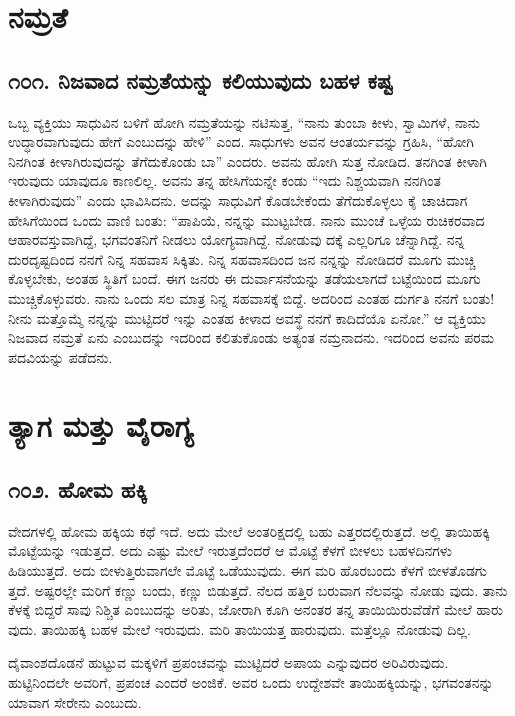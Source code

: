 \chapter{ನಮ್ರತೆ}

\section{\num{೧೦೧. } ನಿಜವಾದ ನಮ್ರತೆಯನ್ನು ಕಲಿಯುವುದು ಬಹಳ ಕಷ್ಟ}

ಒಬ್ಬ ವ್ಯಕ್ತಿಯು ಸಾಧುವಿನ ಬಳಿಗೆ ಹೋಗಿ ನಮ್ರತೆಯನ್ನು ನಟಿಸುತ್ತ, “ನಾನು ತುಂಬಾ ಕೀಳು, ಸ್ವಾಮಿಗಳೆ, ನಾನು ಉದ್ಧಾರವಾಗುವುದು ಹೇಗೆ ಎಂಬುದನ್ನು ಹೇಳಿ” ಎಂದ. ಸಾಧುಗಳು ಅವನ ಆಂತರ್ಯವನ್ನು ಗ್ರಹಿಸಿ, “ಹೋಗಿ ನಿನಗಿಂತ ಕೀಳಾಗಿರುವುದನ್ನು ತೆಗೆದುಕೊಂಡು ಬಾ” ಎಂದರು. ಅವನು ಹೋಗಿ ಸುತ್ತ ನೋಡಿದ. ತನಗಿಂತ ಕೀಳಾಗಿ ಇರುವುದು ಯಾವುದೂ ಕಾಣಲಿಲ್ಲ. ಅವನು ತನ್ನ ಹೇಸಿಗೆಯನ್ನೇ ಕಂಡು “ಇದು ನಿಶ್ಚಯವಾಗಿ ನನಗಿಂತ ಕೀಳಾಗಿರುವುದು” ಎಂದು ಭಾವಿಸಿದನು. ಅದನ್ನು ಸಾಧುವಿಗೆ ಕೊಡಬೇಕೆಂದು ತೆಗೆದುಕೊಳ್ಳಲು ಕೈ ಚಾಚಿದಾಗ ಹೇಸಿಗೆಯಿಂದ ಒಂದು ವಾಣಿ ಬಂತು: “ಪಾಪಿಯೆ, ನನ್ನನ್ನು ಮುಟ್ಟಬೇಡ. ನಾನು ಮುಂಚೆ ಒಳ್ಳೆಯ ರುಚಿಕರವಾದ ಆಹಾರವಸ್ತುವಾಗಿದ್ದೆ, ಭಗವಂತನಿಗೆ ನೀಡಲು ಯೋಗ್ಯವಾಗಿದ್ದೆ. ನೋಡುವು ದಕ್ಕೆ ಎಲ್ಲರಿಗೂ ಚೆನ್ನಾಗಿದ್ದೆ. ನನ್ನ ದುರದೃಷ್ಟದಿಂದ ನನಗೆ ನಿನ್ನ ಸಹವಾಸ ಸಿಕ್ಕಿತು. ನಿನ್ನ ಸಹವಾಸದಿಂದ ಜನ ನನ್ನನ್ನು ನೋಡಿದರೆ ಮೂಗು ಮುಚ್ಚಿ ಕೊಳ್ಳಬೇಕು, ಅಂತಹ ಸ್ಥಿತಿಗೆ ಬಂದೆ. ಈಗ ಜನರು ಈ ದುರ್ವಾಸನೆಯನ್ನು ತಡೆಯಲಾಗದೆ ಬಟ್ಟೆಯಿಂದ ಮೂಗು ಮುಚ್ಚಿಕೊಳ್ಳುವರು. ನಾನು ಒಂದು ಸಲ ಮಾತ್ರ ನಿನ್ನ ಸಹವಾಸಕ್ಕೆ ಬಿದ್ದೆ. ಅದರಿಂದ ಎಂತಹ ದುರ್ಗತಿ ನನಗೆ ಬಂತು! ನೀನು ಮತ್ತೊಮ್ಮೆ ನನ್ನನ್ನು ಮುಟ್ಟಿದರೆ ಇನ್ನು ಎಂತಹ ಕೀಳಾದ ಅವಸ್ಥೆ ನನಗೆ ಕಾದಿದೆಯೊ ಏನೋ.” ಆ ವ್ಯಕ್ತಿಯು ನಿಜವಾದ ನಮ್ರತೆ ಏನು ಎಂಬುದನ್ನು ಇದರಿಂದ ಕಲಿತುಕೊಂಡು ಅತ್ಯಂತ ನಮ್ರನಾದನು. ಇದರಿಂದ ಅವನು ಪರಮ ಪದವಿಯನ್ನು ಪಡೆದನು.

\chapter{ತ್ಯಾಗ ಮತ್ತು ವೈರಾಗ್ಯ}

\section{\num{೧೦೨. } ಹೋಮ ಹಕ್ಕಿ}

ವೇದಗಳಲ್ಲಿ ಹೋಮ ಹಕ್ಕಿಯ ಕಥೆ ಇದೆ. ಅದು ಮೇಲೆ ಅಂತರಿಕ್ಷದಲ್ಲಿ ಬಹು ಎತ್ತರದಲ್ಲಿರುತ್ತದೆ. ಅಲ್ಲಿ ತಾಯಿಹಕ್ಕಿ ಮೊಟ್ಟೆಯನ್ನು ಇಡುತ್ತದೆ. ಅದು ಎಷ್ಟು ಮೇಲೆ ಇರುತ್ತದೆಂದರೆ ಆ ಮೊಟ್ಟೆ ಕೆಳಗೆ ಬೀಳಲು ಬಹಳದಿನಗಳು ಹಿಡಿಯುತ್ತದೆ. ಅದು ಬೀಳುತ್ತಿರುವಾಗಲೇ ಮೊಟ್ಟೆ ಒಡೆಯುವುದು. ಈಗ ಮರಿ ಹೊರಬಂದು ಕೆಳಗೆ ಬೀಳತೊಡಗು ತ್ತದೆ. ಅಷ್ಟರಲ್ಲೇ ಮರಿಗೆ ಕಣ್ಣು ಬಂದು, ಕಣ್ಣು ಬಿಡುತ್ತದೆ. ನೆಲದ ಹತ್ತಿರ ಬರುವಾಗ ನೆಲವನ್ನು ನೋಡು ವುದು. ತಾನು ಕೆಳಕ್ಕೆ ಬಿದ್ದರೆ ಸಾವು ನಿಶ್ಚಿತ ಎಂಬುದನ್ನು ಅರಿತು, ಜೋರಾಗಿ ಕೂಗಿ ಅನಂತರ ತನ್ನ ತಾಯಿಯಿರುವೆಡೆಗೆ ಮೇಲೆ ಹಾರು ವುದು. ತಾಯಿಹಕ್ಕಿ ಬಹಳ ಮೇಲೆ ಇರುವುದು. ಮರಿ ತಾಯಿಯತ್ತ ಹಾರುವುದು. ಮತ್ತೆಲ್ಲೂ ನೋಡುವು ದಿಲ್ಲ.

ದೈವಾಂಶದೊಡನೆ ಹುಟ್ಟುವ ಮಕ್ಕಳಿಗೆ ಪ್ರಪಂಚವನ್ನು ಮುಟ್ಟಿದರೆ ಅಪಾಯ ಎನ್ನುವುದರ ಅರಿವಿರುವುದು. ಹುಟ್ಟಿನಿಂದಲೇ ಅವರಿಗೆ, ಪ್ರಪಂಚ ಎಂದರೆ ಅಂಜಿಕೆ. ಅವರ ಒಂದು ಉದ್ದೇಶವೇ ತಾಯಿಹಕ್ಕಿಯನ್ನು, ಭಗವಂತನನ್ನು ಯಾವಾಗ ಸೇರೇನು ಎಂಬುದು.


